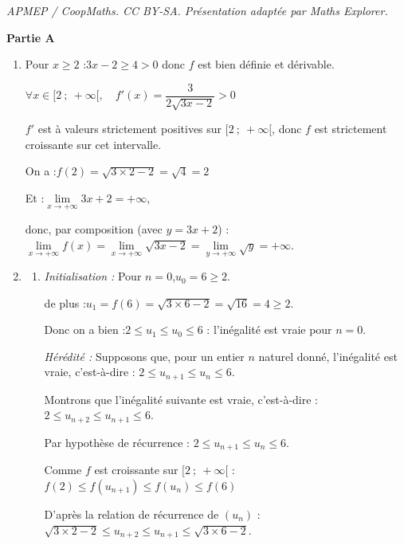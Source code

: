 \documentclass[10pt]{article}
\begin{document}
\noindent\textit{APMEP / CoopMaths. CC BY-SA. Présentation adaptée par Maths Explorer.}\par\medskip
\medskip

	\textbf{Partie A}

	\medskip

	\begin{enumerate}
		\item Pour $x \geqslant 2$ :\quad $3x - 2 \geqslant 4 > 0$ donc $f$ est bien définie et dérivable.

		$\forall x \in [2 ~;~+\infty [,\quad f'(x) = \dfrac{3}{2\sqrt{3x-2}} > 0$

		$f'$ est à valeurs strictement positives sur $[2~;~+\infty[$, donc $f$ est strictement croissante sur cet intervalle.

		On a :\quad $f(2) = \sqrt{3\times 2 - 2} = \sqrt{4} = 2$

		Et :\quad $\lim\limits_{x \to +\infty} 3x + 2 = +\infty$,

		donc, par composition (avec $y = 3x + 2$) :\quad $\lim\limits_{x \to +\infty} f(x) = \lim\limits_{x \to +\infty} \sqrt{3x - 2} = \lim\limits_{y \to +\infty} \sqrt{y} = +\infty$.

		\item
		\begin{enumerate}
			\item \emph{Initialisation :} Pour $n = 0$,\quad $u_0 = 6 \geqslant 2$.

			de plus :\quad $u_1 = f(6) = \sqrt{3\times 6 - 2} = \sqrt{16} = 4 \geqslant 2$.

			Donc on a bien :\quad $2 \leqslant u_1 \leqslant u_0 \leqslant 6$ : l'inégalité est vraie pour $n =0$.

			\emph{Hérédité :} Supposons que, pour un entier $n$ naturel donné, l'inégalité est vraie, c'est-à-dire : \quad $2 \leqslant u_{n+1} \leqslant u_n \leqslant 6$.


			Montrons que l'inégalité suivante est vraie, c'est-à-dire :\quad $2 \leqslant u_{n+2} \leqslant u_{n+1}\leqslant 6$.

			Par hypothèse de récurrence : \quad $2 \leqslant u_{n+1} \leqslant u_n \leqslant 6$.

			Comme $f$ est croissante sur $[2 ~;~ + \infty[$ :\quad $f(2) \leqslant f(u_{n+1}) \leqslant f(u_n)\leqslant f(6)$

			D'après la relation de récurrence de $(u_n)$ :\quad $\sqrt{3\times 2 - 2} \leqslant u_{n+2} \leqslant u_{n+1}\leqslant \sqrt{3\times 6 - 2}$.


\end{enumerate}
\end{enumerate}
\end{document}
